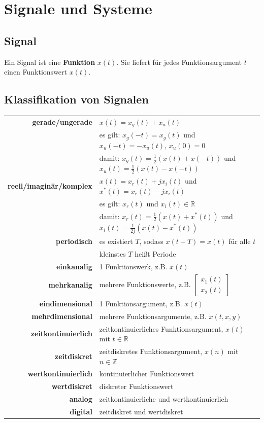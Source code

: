 \documentclass[10pt,a4paper]{article}
\author{Florian Euchner, Stefan Köbel, Chong Shen, Jan Frederik Dick}
\newcommand{\fancythumb}[2]{
	\addthumb{#1}{\large\sffamily\textbf{\space\space#1\vspace{5pt}}}{white}{#2}
}
\begin{document}
\section*{Signale und Systeme}
\fancythumb{S\&S}{teal}
\subsection*{Signal}
Ein Signal ist eine \textbf{Funktion} $x(t)$. Sie liefert für jedes Funktionsargument $t$ einen Funktionswert $x(t)$.
\subsection*{Klassifikation von Signalen}
\begin{tabular}{r p{12cm}}
	\textbf{gerade/ungerade} & $x(t)=x_g(t)+x_u(t)$\\
	 & es gilt: $x_g(-t)=x_g(t)$ und $x_u(-t)=-x_u(t)$, $x_u(0)=0$\\
	 & damit: $x_g(t)=\frac{1}{2}(x(t)+x(-t))$ und $x_u(t)=\frac{1}{2}(x(t)-x(-t))$\\
	 \textbf{reell/imaginär/komplex} & $x(t)=x_r(t)+jx_i(t)$ und $x^*(t)=x_r(t)-jx_i(t)$\\
	 & es gilt: $x_r(t)$ und $x_i(t) \in \mathbb R$\\
	 & damit: $x_r(t)=\frac{1}{2}(x(t)+x^*(t))$ und $x_i(t)=\frac{1}{2j}(x(t)-x^*(t))$\\
	 \textbf{periodisch} & es existiert $T$, sodass $x(t+T)=x(t)$ für alle $t$\\
	 & kleinstes $T$ heißt Periode\\
	 \textbf{einkanalig} & 1 Funktionswerk, z.B. $x(t)$\\
	 \textbf{mehrkanalig} & mehrere Funktionswerte, z.B.
	$\begin{bmatrix}
		x_1(t) \\ 
		x_2(t)
	\end{bmatrix}$\\
	\textbf{eindimensional} & 1 Funktionsargument, z.B. $x(t)$\\
	\textbf{mehrdimensional} & mehrere Funktionsargumente, z.B. $x(t,x,y)$\\
	\textbf{zeitkontinuierlich} & zeitkontinuierliches Funktionsargument, $x(t)$ mit $t \in \mathbb R$\\
	\textbf{zeitdiskret} & zeitdiskretes Funktionsargument, $x(n)$ mit $n \in \mathbb Z$\\
	\textbf{wertkontinuierlich} & kontinuierlicher Funktionswert\\
	\textbf{wertdiskret} & diskreter Funktionswert\\
	\textbf{analog} & zeitkontinuierliche und wertkontinuierlich\\
	\textbf{digital} & zeitdiskret und wertdiskret\\
\end{tabular}
\end{document}
